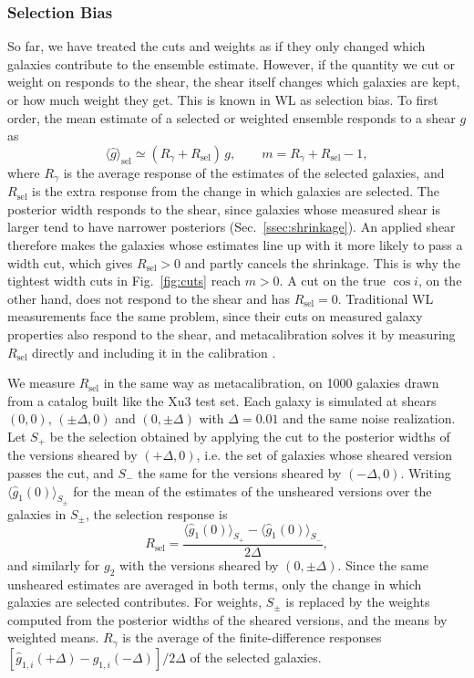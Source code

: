 \subsubsection{Selection Bias}
\label{sssec:selection}

So far, we have treated the cuts and weights as if they only changed which galaxies contribute to the ensemble estimate. However, if the quantity we cut or weight on responds to the shear, the shear itself changes which galaxies are kept, or how much weight they get. This is known in WL as selection bias. To first order, the mean estimate of a selected or weighted ensemble responds to a shear $g$ as
\begin{equation}
\label{eqn:selection-response}
    \langle\hat{g}\rangle_\mathrm{sel} \simeq (R_\gamma + R_\mathrm{sel})\, g, \qquad m = R_\gamma + R_\mathrm{sel} - 1,
\end{equation}
where $R_\gamma$ is the average response of the estimates of the selected galaxies, and $R_\mathrm{sel}$ is the extra response from the change in which galaxies are selected. The posterior width responds to the shear, since galaxies whose measured shear is larger tend to have narrower posteriors (Sec.~\ref{ssec:shrinkage}). An applied shear therefore makes the galaxies whose estimates line up with it more likely to pass a width cut, which gives $R_\mathrm{sel} > 0$ and partly cancels the shrinkage. This is why the tightest width cuts in Fig.~\ref{fig:cuts} reach $m > 0$. A cut on the true $\cos i$, on the other hand, does not respond to the shear and has $R_\mathrm{sel} = 0$. Traditional WL measurements face the same problem, since their cuts on measured galaxy properties also respond to the shear, and metacalibration solves it by measuring $R_\mathrm{sel}$ directly and including it in the calibration \citep{MetacalPractical, Metadet}.

We measure $R_\mathrm{sel}$ in the same way as metacalibration, on 1000 galaxies drawn from a catalog built like the Xu3 test set. Each galaxy is simulated at shears $(0,0)$, $(\pm\Delta, 0)$ and $(0, \pm\Delta)$ with $\Delta = 0.01$ and the same noise realization. Let $S_+$ be the selection obtained by applying the cut to the posterior widths of the versions sheared by $(+\Delta, 0)$, i.e. the set of galaxies whose sheared version passes the cut, and $S_-$ the same for the versions sheared by $(-\Delta, 0)$. Writing $\langle \hat{g}_1(0) \rangle_{S_\pm}$ for the mean of the estimates of the unsheared versions over the galaxies in $S_\pm$, the selection response is
\begin{equation}
\label{eqn:rsel}
    R_\mathrm{sel} = \frac{\langle \hat{g}_1(0) \rangle_{S_+} - \langle \hat{g}_1(0) \rangle_{S_-}}{2\Delta},
\end{equation}
and similarly for $g_2$ with the versions sheared by $(0, \pm\Delta)$. Since the same unsheared estimates are averaged in both terms, only the change in which galaxies are selected contributes. For weights, $S_\pm$ is replaced by the weights computed from the posterior widths of the sheared versions, and the means by weighted means. $R_\gamma$ is the average of the finite-difference responses $[\hat{g}_{1,i}(+\Delta) - \hat{g}_{1,i}(-\Delta)]/2\Delta$ of the selected galaxies.

